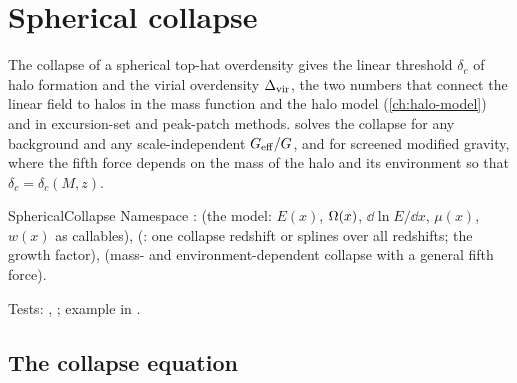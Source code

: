 \chapter{Spherical collapse}\label{ch:spherical-collapse}

The collapse of a spherical top-hat overdensity gives the linear threshold $\delta_c$ of halo formation and the virial
overdensity $\Delta_{\rm vir}$, the two numbers that connect the linear field to halos in the mass function and the halo
model (\cref{ch:halo-model}) and in excursion-set and peak-patch methods. \fml{} solves the collapse for any background
and any scale-independent $G_{\rm eff}/G$, and for screened modified gravity, where the fifth force depends on the mass
of the halo and its environment so that $\delta_c=\delta_c(M,z)$.

\begin{modulebox}{SphericalCollapse}
Namespace :  (the model: $E(x)$, $\Omega(x)$,
$\dd\ln E/\dd x$, $\mu(x)$, $w(x)$ as callables),  (: one collapse
redshift or splines over all redshifts; the growth factor),  (mass- and
environment-dependent collapse with a general fifth force).\par
Tests: , ; example in .
\end{modulebox}

\section{The collapse equation}\label{sec:sc-equation}

